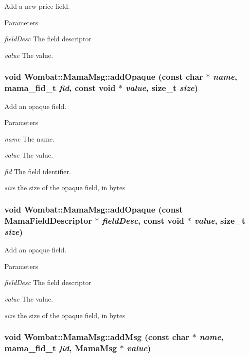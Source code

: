 Add a new price field. 
\begin{DoxyParams}{Parameters}
\item[{\em fieldDesc}]The field descriptor \item[{\em value}]The value. \end{DoxyParams}
\hypertarget{classWombat_1_1MamaMsg_a8b9cdd0ec61cadde6ad08571284c2df5}{
\subsubsection[{addOpaque}]{\setlength{\rightskip}{0pt plus 5cm}void Wombat::MamaMsg::addOpaque (const char $\ast$ {\em name}, \/  mama\_\-fid\_\-t {\em fid}, \/  const void $\ast$ {\em value}, \/  size\_\-t {\em size})}}
\label{classWombat_1_1MamaMsg_a8b9cdd0ec61cadde6ad08571284c2df5}


Add an opaque field. 
\begin{DoxyParams}{Parameters}
\item[{\em name}]The name. \item[{\em value}]The value. \item[{\em fid}]The field identifier. \item[{\em size}]the size of the opaque field, in bytes \end{DoxyParams}
\hypertarget{classWombat_1_1MamaMsg_af56187013655a113251ace08ac0bf99c}{
\subsubsection[{addOpaque}]{\setlength{\rightskip}{0pt plus 5cm}void Wombat::MamaMsg::addOpaque (const {\bf MamaFieldDescriptor} $\ast$ {\em fieldDesc}, \/  const void $\ast$ {\em value}, \/  size\_\-t {\em size})}}
\label{classWombat_1_1MamaMsg_af56187013655a113251ace08ac0bf99c}


Add an opaque field. 
\begin{DoxyParams}{Parameters}
\item[{\em fieldDesc}]The field descriptor \item[{\em value}]The value. \item[{\em size}]the size of the opaque field, in bytes \end{DoxyParams}
\hypertarget{classWombat_1_1MamaMsg_a384ea357a6ad5f2666d758344768035d}{
\subsubsection[{addMsg}]{\setlength{\rightskip}{0pt plus 5cm}void Wombat::MamaMsg::addMsg (const char $\ast$ {\em name}, \/  mama\_\-fid\_\-t {\em fid}, \/  {\bf MamaMsg} $\ast$ {\em value})}}
\label{classWombat_1_1MamaMsg_a384ea357a6ad5f2666d758344768035d}



